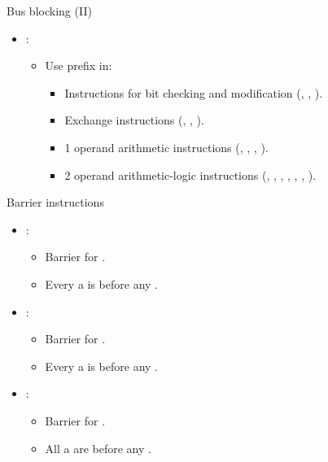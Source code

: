 \begin{frame}[t]{Bus blocking (II)}
\begin{itemize}
  \item {}:
    \begin{itemize}
      \item Use  prefix in:
        \begin{itemize}
          \item Instructions for bit checking and modification
                (, , ).
          \item Exchange instructions 
                (, , ).
          \item 1 operand arithmetic instructions
                (, , , ).
          \item 2 operand arithmetic-logic instructions
                (, , , 
                , , , ).
        \end{itemize}
    \end{itemize}
\end{itemize}
\end{frame}

\begin{frame}[t]{Barrier instructions}
\begin{itemize}
  \item {}:
    \begin{itemize}
      \item Barrier for .
      \item Every  a  
            is  
            before any .
    \end{itemize}

  \item {}:
    \begin{itemize}
      \item Barrier for .
      \item Every  a  
            is  
            before any .
    \end{itemize}

  \item {}:
    \begin{itemize}
      \item Barrier for .
      \item All  a  
            are  
            before any .
    \end{itemize}
\end{itemize}
\end{frame}

